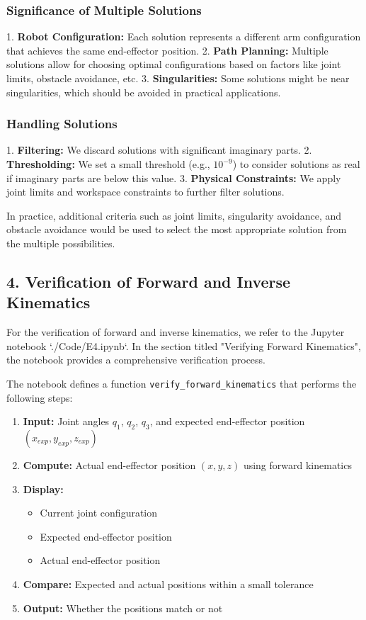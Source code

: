 \begin{solution}
\subsubsection*{Significance of Multiple Solutions}

1. \textbf{Robot Configuration:} Each solution represents a different arm configuration that achieves the same end-effector position.
2. \textbf{Path Planning:} Multiple solutions allow for choosing optimal configurations based on factors like joint limits, obstacle avoidance, etc.
3. \textbf{Singularities:} Some solutions might be near singularities, which should be avoided in practical applications.

\subsubsection*{Handling Solutions}

1. \textbf{Filtering:} We discard solutions with significant imaginary parts.
2. \textbf{Thresholding:} We set a small threshold (e.g., $10^{-9}$) to consider solutions as real if imaginary parts are below this value.
3. \textbf{Physical Constraints:} We apply joint limits and workspace constraints to further filter solutions.

In practice, additional criteria such as joint limits, singularity avoidance, and obstacle avoidance would be used to select the most appropriate solution from the multiple possibilities.
	
\subsection*{4. Verification of Forward and Inverse Kinematics}


For the verification of forward and inverse kinematics, we refer to the Jupyter notebook `./Code/E4.ipynb`. In the section titled "Verifying Forward Kinematics", the notebook provides a comprehensive verification process.

The notebook defines a function \texttt{verify\_forward\_kinematics} that performs the following steps:

\begin{enumerate}
    \item \textbf{Input:} Joint angles $q_1$, $q_2$, $q_3$, and expected end-effector position $(x_{exp}, y_{exp}, z_{exp})$
    \item \textbf{Compute:} Actual end-effector position $(x, y, z)$ using forward kinematics
    \item \textbf{Display:} 
        \begin{itemize}
            \item Current joint configuration
            \item Expected end-effector position
            \item Actual end-effector position
        \end{itemize}
    \item \textbf{Compare:} Expected and actual positions within a small tolerance
    \item \textbf{Output:} Whether the positions match or not
\end{enumerate}


\end{solution}

